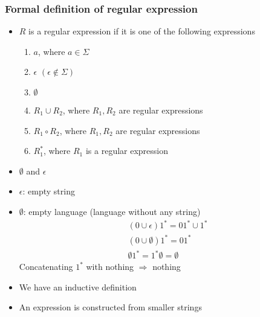 \begin{frame}[allowframebreaks] \frametitle{Formal definition of regular expression}
\begin{itemize}
\item $R$ is a regular expression if it is one of the following
expressions
\begin{enumerate}
\item $a$, where $a \in \Sigma$
\item $\epsilon$ $(\epsilon \notin \Sigma)$
\item $\emptyset$
\item $R_1 \cup R_2$,  where $R_1, R_2$ are regular expressions
\item $R_1 \circ R_2$, where $R_1, R_2$ are regular expressions
\item $R_1^*$,  where $R_1$ is a regular expression
\end{enumerate}

\item $\emptyset$ and $\epsilon$

\item  [] $\epsilon$: empty string

\item []  $\emptyset$: empty language (language without any string)
  \begin{equation*}
    \begin{split}
&(0 \cup \epsilon)1^*=01^* \cup 1^* \\
&(0 \cup \emptyset)1^*=01^* \\
&\emptyset 1^* = 1^* \emptyset = \emptyset
\end{split}
\end{equation*}
Concatenating $1^*$ with nothing $\Rightarrow$ nothing

\item We have an inductive definition

\item [] An expression is constructed from smaller strings

\end{itemize}\end{frame}

